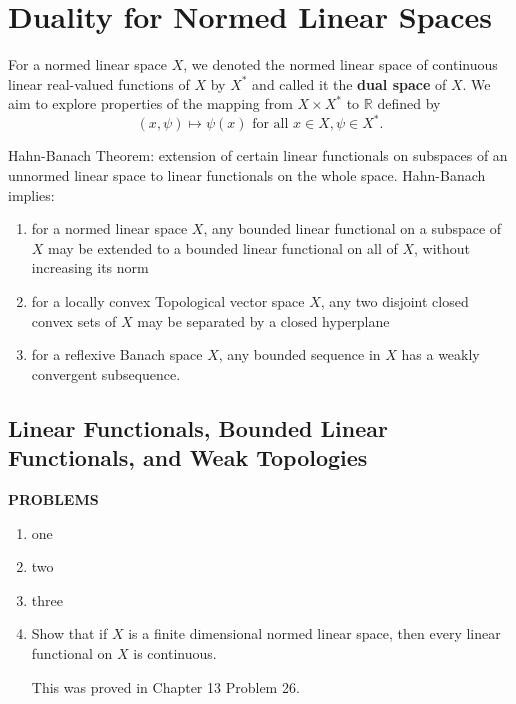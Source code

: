 \chapter{Duality for Normed Linear Spaces}

For a normed linear space $X$, we denoted the normed linear space of continuous linear real-valued functions of $X$ by $X^*$ and called it the \textbf{dual space} of $X$.
We aim to explore properties of the mapping from $X\times X^*$ to $\mathbb{R}$ defined by
\[
    (x,\psi)\mapsto\psi(x)\text{ for all }x\in X,\psi\in X^*.
\]

Hahn-Banach Theorem: extension of certain linear functionals on subspaces of an unnormed linear space to linear functionals on the whole space.
Hahn-Banach implies:
\begin{enumerate}
    \item for a normed linear space $X$, any bounded linear functional on a subspace of $X$ may be extended to a bounded linear functional on all of $X$, without increasing its norm
    \item for a locally convex Topological vector space $X$, any two disjoint closed convex sets of $X$ may be separated by a closed hyperplane
    \item for a reflexive Banach space $X$, any bounded sequence in $X$ has a weakly convergent subsequence.
\end{enumerate}

\section{Linear Functionals, Bounded Linear Functionals, and Weak Topologies}



\begin{center}
	\textbf{PROBLEMS}
\end{center}
\begin{enumerate}
	\setcounter{enumi}{0}
    \item one
    \item two
    \item three
    \item Show that if $X$ is a finite dimensional normed linear space, then every linear functional on $X$ is continuous.
    
    This was proved in Chapter 13 Problem 26.

    
\end{enumerate}

